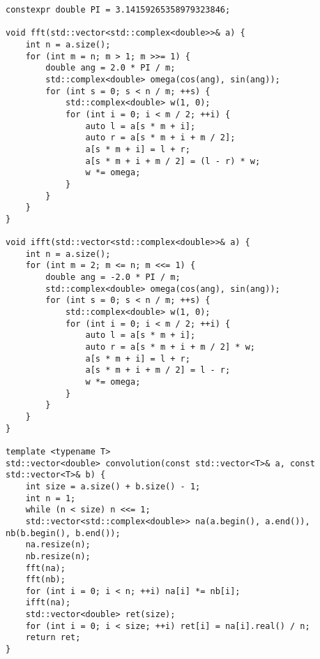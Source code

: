 \begin{lstlisting}
constexpr double PI = 3.14159265358979323846;

void fft(std::vector<std::complex<double>>& a) {
    int n = a.size();
    for (int m = n; m > 1; m >>= 1) {
        double ang = 2.0 * PI / m;
        std::complex<double> omega(cos(ang), sin(ang));
        for (int s = 0; s < n / m; ++s) {
            std::complex<double> w(1, 0);
            for (int i = 0; i < m / 2; ++i) {
                auto l = a[s * m + i];
                auto r = a[s * m + i + m / 2];
                a[s * m + i] = l + r;
                a[s * m + i + m / 2] = (l - r) * w;
                w *= omega;
            }
        }
    }
}

void ifft(std::vector<std::complex<double>>& a) {
    int n = a.size();
    for (int m = 2; m <= n; m <<= 1) {
        double ang = -2.0 * PI / m;
        std::complex<double> omega(cos(ang), sin(ang));
        for (int s = 0; s < n / m; ++s) {
            std::complex<double> w(1, 0);
            for (int i = 0; i < m / 2; ++i) {
                auto l = a[s * m + i];
                auto r = a[s * m + i + m / 2] * w;
                a[s * m + i] = l + r;
                a[s * m + i + m / 2] = l - r;
                w *= omega;
            }
        }
    }
}

template <typename T>
std::vector<double> convolution(const std::vector<T>& a, const std::vector<T>& b) {
    int size = a.size() + b.size() - 1;
    int n = 1;
    while (n < size) n <<= 1;
    std::vector<std::complex<double>> na(a.begin(), a.end()), nb(b.begin(), b.end());
    na.resize(n);
    nb.resize(n);
    fft(na);
    fft(nb);
    for (int i = 0; i < n; ++i) na[i] *= nb[i];
    ifft(na);
    std::vector<double> ret(size);
    for (int i = 0; i < size; ++i) ret[i] = na[i].real() / n;
    return ret;
}
\end{lstlisting}

